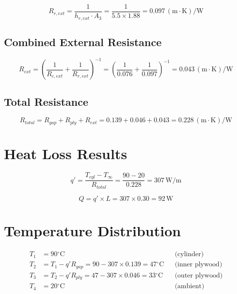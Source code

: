 \documentclass[11pt]{article}
\newcommand{\degC}{$^\circ$C}
\newcommand{\unit}[1]{\,\mathrm{#1}}
\begin{document}
\begin{equation}
    R_{r,ext} = \frac{1}{h_{r,ext} \cdot A_3} = \frac{1}{5.5 \times 1.88} = \boxed{0.097\unit{(m \cdot K)/W}}
\end{equation}

\subsection{Combined External Resistance}

\begin{equation}
    R_{ext} = \left(\frac{1}{R_{c,ext}} + \frac{1}{R_{r,ext}}\right)^{-1} = \left(\frac{1}{0.076} + \frac{1}{0.097}\right)^{-1} = \boxed{0.043\unit{(m \cdot K)/W}}
\end{equation}

\subsection{Total Resistance}

\begin{equation}
    R_{total} = R_{gap} + R_{ply} + R_{ext} = 0.139 + 0.046 + 0.043 = \boxed{0.228\unit{(m \cdot K)/W}}
\end{equation}

\section{Heat Loss Results}

\begin{equation}
    q' = \frac{T_{cyl} - T_\infty}{R_{total}} = \frac{90 - 20}{0.228} = \boxed{307\unit{W/m}}
\end{equation}

\begin{equation}
    Q = q' \times L = 307 \times 0.30 = \boxed{92\unit{W}}
\end{equation}

\section{Temperature Distribution}

\begin{align}
    T_1 &= 90\text{\degC} && \text{(cylinder)} \\
    T_2 &= T_1 - q' R_{gap} = 90 - 307 \times 0.139 = \boxed{47\text{\degC}} && \text{(inner plywood)} \\
    T_3 &= T_2 - q' R_{ply} = 47 - 307 \times 0.046 = \boxed{33\text{\degC}} && \text{(outer plywood)} \\
    T_4 &= 20\text{\degC} && \text{(ambient)}
\end{align}
\end{document}
